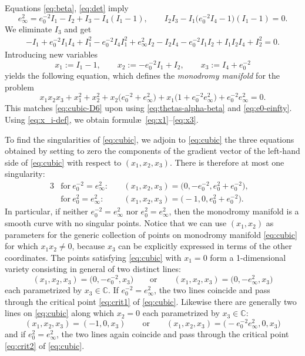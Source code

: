 \documentclass[11pt]{article}
\numberwithin{equation}{section}
\numberwithin{equation}{section}
\begin{document}
Equations \eqref{eq:beta}, \eqref{eq:det} imply
\begin{equation*}
 e_\infty^2 =e_0^{-2} I_1-I_2+I_3-I_4(I_1-1),\qquad I_2I_3-I_1\big(e_0^{-2} I_4-1\big)(I_1-1)=0.
\end{equation*}
We eliminate $I_3$ and get
\begin{gather*}
 -I_1+e_0^{-2} I_1 I_4+I_1^2-e_0^{-2} I_4 I_1^2+e_\infty^2 I_2- I_2I_4 -e_0^{-2}I_1I_2+I_1I_2I_4+I_2^2=0.
\end{gather*}
Introducing new variables
\begin{equation}
x_1:=I_1-1,\qquad x_2:=-e_0^{-2} I_1+I_2,\qquad x_3:=I_4+e_0^{-2}
\label{eq:x_i-def}
\end{equation}
yields the following equation, which defines the \emph{monodromy manifold} for the problem
\begin{equation}
 \label{eq:cubic} x_1x_2x_3+x_1^2+x_2^2+x_2\big(e_0^{-2}+e_\infty^2\big)+x_1\big(1+e^{-2}_0 e^{2}_\infty\big)+e^{-2}_0e^{2}_\infty=0.
\end{equation}
This matches \eqref{eq:cubic-D6} upon using \eqref{eq:thetas-alpha-beta} and \eqref{eq:e0-einfty}. Using \eqref{eq:x_i-def}, we obtain formul\ae\ \eqref{eq:x1}--\eqref{eq:x3}.

To find the singularities of \eqref{eq:cubic}, we adjoin to \eqref{eq:cubic} the three equations obtained by setting to zero the components of the gradient vector of the left-hand side of \eqref{eq:cubic} with respect to $(x_1,x_2,x_3)$. There is therefore at most one singularity:
\begin{alignat}{3}\label{eq:crit1}
 &\text{for}\ e^{-2}_0=e^2_\infty\colon\ &&(x_1,x_2,x_3)=\big(0,-e^{-2}_0,e^{2}_0+e_0^{-2}\big),&\\
 &\text{for}\ e^{2}_0=e_\infty^{2}\colon\ &&(x_1,x_2,x_3)=\bigl(-1,0,e^{2}_0+e_0^{-2}\bigr).&\label{eq:crit2}
\end{alignat}
In particular, if neither $e^{-2}_0=e^2_\infty$ nor $e^{2}_0=e^2_\infty$, then the monodromy manifold is a smooth curve with no singular points.
Notice that we can use $(x_1,x_2)$ as parameters for the generic collection of points on monodromy manifold \eqref{eq:cubic} for which $x_1x_2\neq 0$, because $x_3$ can be explicitly expressed in terms of the other coordinates. The points satisfying \eqref{eq:cubic} with $x_1=0$ form a 1-dimensional variety consisting in general of two distinct lines:
\begin{equation*}
 (x_1,x_2,x_3)=\big(0,-e^{-2}_0,x_3\big)\qquad\text{or}\qquad (x_1,x_2,x_3)=\big(0,-e^2_\infty,x_3\big)
\end{equation*}
each parametrized by $x_3\in\mathbb{C}$. If $e_0^{-2}=e_\infty^2$, the two lines coincide and pass through the critical point \eqref{eq:crit1} of \eqref{eq:cubic}. Likewise there are generally two lines on \eqref{eq:cubic} along which $x_2=0$ each parametrized by $x_3\in\mathbb{C}$:
\begin{equation*}
 (x_1,x_2,x_3)=(-1,0,x_3)\qquad\text{or}\qquad (x_1,x_2,x_3)=\bigl(-e^{-2}_0e^2_\infty,0,x_3\bigr)
\end{equation*}
and if $e^{2}_0=e_\infty^{2}$, the two lines again coincide and pass through the critical point \eqref{eq:crit2} of \eqref{eq:cubic}.
\end{document}
